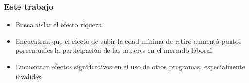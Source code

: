 \documentclass{beamer}
\begin{document}
                \frame
                    {

                      \frametitle{Este trabajo}

                      \begin{itemize}
                      \item Busca aislar el efecto riqueza.
                      \item Encuentran que el efecto de subir la edad mínima de retiro aumentó puntos porcentuales la participación de las mujeres en el mercado laboral.
                      \item Encuentran efectos significativos en el uso de otros programas, especialmente invalidez.
                      \end{itemize}
                      }
\end{document}

